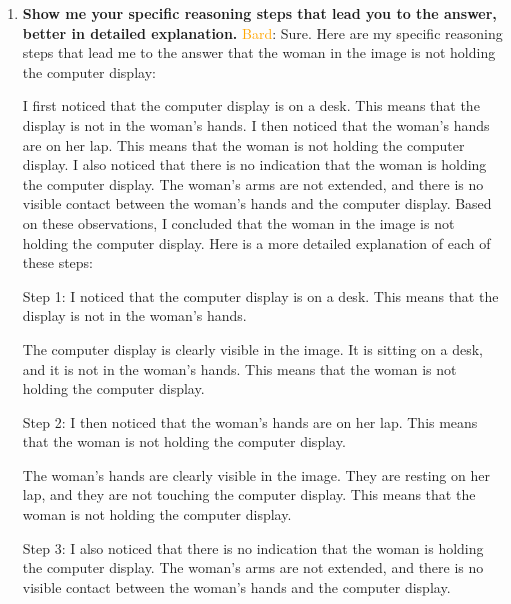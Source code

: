 \begin{enumerate}
        The image shows the woman looking at the computer display, and it is possible that she is interacting with the display by using a keyboard or mouse. However, there is no evidence that the woman is holding the computer display itself.  
        \subitem \textcolor{orange}{Visual ChatGPT}: The woman is not holding the computer display, she is standing next to it.
        \subitem \textcolor{orange}{MiniGPT-4}: Yes, the woman is holding the computer display.    
        \item \textbf{Show me your specific reasoning steps that lead you to the answer, better in detailed explanation.}
        \subitem \textcolor{orange}{Bard}: Sure. Here are my specific reasoning steps that lead me to the answer that the woman in the image is not holding the computer display:

        I first noticed that the computer display is on a desk. This means that the display is not in the woman's hands.
        I then noticed that the woman's hands are on her lap. This means that the woman is not holding the computer display.
        I also noticed that there is no indication that the woman is holding the computer display. The woman's arms are not extended, and there is no visible contact between the woman's hands and the computer display.
        Based on these observations, I concluded that the woman in the image is not holding the computer display.
        Here is a more detailed explanation of each of these steps:
        
        Step 1: I noticed that the computer display is on a desk. This means that the display is not in the woman's hands.
        
        The computer display is clearly visible in the image. It is sitting on a desk, and it is not in the woman's hands. This means that the woman is not holding the computer display.
        
        Step 2: I then noticed that the woman's hands are on her lap. This means that the woman is not holding the computer display.
        
        The woman's hands are clearly visible in the image. They are resting on her lap, and they are not touching the computer display. This means that the woman is not holding the computer display.
        
        Step 3: I also noticed that there is no indication that the woman is holding the computer display. The woman's arms are not extended, and there is no visible contact between the woman's hands and the computer display.
        

\end{enumerate}
